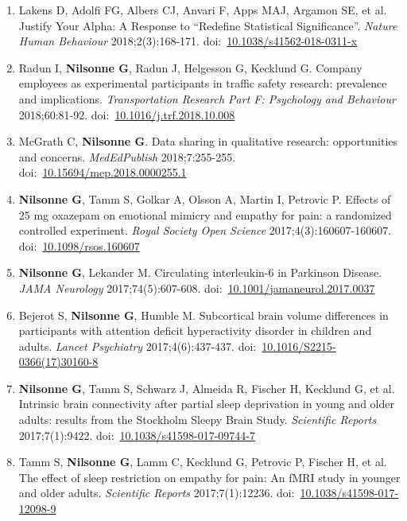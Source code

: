 \documentclass[11pt,a4paper]{article}
\begin{document}
\begin{enumerate}
\item Lakens D, Adolfi FG, Albers CJ, Anvari F, Apps MAJ, Argamon SE, et al. Justify Your Alpha: A Response to “Redefine Statistical Significance”. \textit{Nature Human Behaviour} 2018;2(3):168-171. doi:~\href{https://doi.org/10.1038/s41562-018-0311-x}{10.1038/s41562-018-0311-x}

\item Radun I, \textbf{Nilsonne G}, Radun J, Helgesson G, Kecklund G. Company employees as experimental participants in traffic safety research: prevalence and implications. \textit{Transportation Research Part F: Psychology and Behaviour} 2018;60:81-92. doi:~\href{https://doi.org/10.1016/j.trf.2018.10.008}{10.1016/j.trf.2018.10.008}

\item McGrath C, \textbf{Nilsonne G}. Data sharing in qualitative research: opportunities and concerns. \textit{MedEdPublish} 2018;7:255-255. doi:~\href{https://doi.org/10.15694/mep.2018.0000255.1}{10.15694/mep.2018.0000255.1}

\item \textbf{Nilsonne G}, Tamm S, Golkar A, Olsson A, Martin I, Petrovic P. Effects of 25 mg oxazepam on emotional mimicry and empathy for pain: a randomized controlled experiment. \textit{Royal Society Open Science} 2017;4(3):160607-160607. doi:~\href{https://doi.org/10.1098/rsos.160607}{10.1098/rsos.160607}

\item \textbf{Nilsonne G}, Lekander M. Circulating interleukin-6 in Parkinson Disease. \textit{JAMA Neurology} 2017;74(5):607-608. doi:~\href{https://doi.org/10.1001/jamaneurol.2017.0037}{10.1001/jamaneurol.2017.0037}

\item Bejerot S, \textbf{Nilsonne G}, Humble M. Subcortical brain volume differences in participants with attention deficit hyperactivity disorder in children and adults. \textit{Lancet Psychiatry} 2017;4(6):437-437. doi:~\href{https://doi.org/10.1016/S2215-0366(17)30160-8}{10.1016/S2215-0366(17)30160-8}

\item \textbf{Nilsonne G}, Tamm S, Schwarz J, Almeida R, Fischer H, Kecklund G, et al. Intrinsic brain connectivity after partial sleep deprivation in young and older adults: results from the Stockholm Sleepy Brain Study. \textit{Scientific Reports} 2017;7(1):9422. doi:~\href{https://doi.org/10.1038/s41598-017-09744-7}{10.1038/s41598-017-09744-7}

\item Tamm S, \textbf{Nilsonne G}, Lamm C, Kecklund G, Petrovic P, Fischer H, et al. The effect of sleep restriction on empathy for pain: An fMRI study in younger and older adults. \textit{Scientific Reports} 2017;7(1):12236. doi:~\href{https://doi.org/10.1038/s41598-017-12098-9}{10.1038/s41598-017-12098-9}


\end{enumerate}
\end{document}
